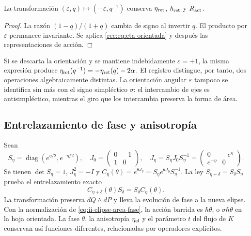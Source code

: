 \begin{corollary}
La transformación \((\varepsilon,q)\mapsto(-\varepsilon,q^{-1})\) conserva \(\eta_{\rm ret}\), \(\hbar_{\rm ret}\) y \(R_{\rm act}\).
\end{corollary}
\begin{proof}
La razón \((1-q)/(1+q)\) cambia de signo al invertir \(q\). El producto por \(\varepsilon\) permanece invariante. Se aplica \eqref{rec:eq:eta-orientada} y después las representaciones de acción.
\end{proof}

Si se descarta la orientación y se mantiene indebidamente \(\varepsilon=+1\), la misma expresión produce \(\eta_{\rm ret}(q^{-1})=-\eta_{\rm ret}(q)-2\alpha\). El registro distingue, por tanto, dos operaciones algebraicamente distintas. La orientación angular \(\varepsilon\) tampoco se identifica sin más con el signo simpléctico \(\sigma\): el intercambio de ejes es antisimpléctico, mientras el giro que los intercambia preserva la forma de área.

\subsection{Entrelazamiento de fase y anisotropía}

Sean
\[
 S_\eta=\operatorname{diag}(e^{\eta/2},e^{-\eta/2}),\quad
 J_0=\begin{pmatrix}0&-1\\1&0\end{pmatrix},\quad
 J_\eta=S_\eta J_0S_\eta^{-1}
       =\begin{pmatrix}0&-e^\eta\\e^{-\eta}&0\end{pmatrix}.
\]
Se tienen \(\det S_\eta=1\), \(J_\eta^2=-I\) y
\(C_\eta(\theta)=e^{\theta J_\eta}=S_\eta e^{\theta J_0}S_\eta^{-1}\).
La ley \(S_{\eta+\delta}=S_\delta S_\eta\) prueba el entrelazamiento exacto
\begin{equation}
 C_{\eta+\delta}(\theta)S_\delta=S_\delta C_\eta(\theta).
 \label{rec:eq:entrelazamiento}
\end{equation}
La transformación preserva \(dQ\wedge dP\) y lleva la evolución de fase a la nueva elipse. Con la normalización de \eqref{eq:ii-elipse-area-fase}, la acción barrida es \(\hbar\theta\), o \(\sigma\hbar\theta\) en la hoja orientada. La fase \(\theta\), la anisotropía \(\eta_{\rm el}\) y el parámetro \(t\) del flujo de \(K\) conservan así funciones diferentes, relacionadas por operadores explícitos.
